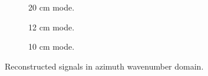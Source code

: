 \begin{figure}[ht!]
\begin{subfigure}{0.5\textwidth}
\begin{center}
 \caption{20 cm mode.}
 \label{fg:20cmreconstructed}
 \end{center}
\end{subfigure}
\begin{subfigure}{0.5\textwidth}
\begin{center}
 \caption{12 cm mode.}
 \label{fg:12cmreconstructed}
 \end{center}
\end{subfigure}
\begin{subfigure}{0.5\textwidth}
\begin{center}
 \caption{10 cm mode.}
 \label{fg:10cmreconstructed}
 \end{center}
\end{subfigure}
\caption{Reconstructed signals in azimuth wavenumber domain.}
\label{fg:reconstructed}
\end{figure}
\clearpage
